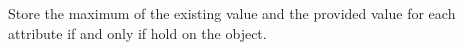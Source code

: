 Store the maximum of the existing value and the provided value for each
attribute if and only if  hold on the object.



